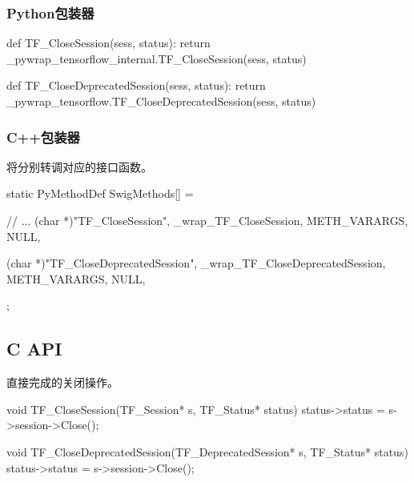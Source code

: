 \begin{content}
\subsubsection{Python包装器}

\begin{leftbar}
\begin{python}[caption={tensorflow/bazel-bin/tensorflow/python/pywrap\_tensorflow\_internal.py}]
def TF_CloseSession(sess, status):
    return _pywrap_tensorflow_internal.TF_CloseSession(sess, status)

def TF_CloseDeprecatedSession(sess, status):
  return _pywrap_tensorflow.TF_CloseDeprecatedSession(sess, status)
\end{python}
\end{leftbar}

\subsubsection{C++包装器}

将分别转调对应的接口函数。

\begin{leftbar}
\begin{c++}[caption={tensorflow/bazel-bin/tensorflow/python/pywrap\_tensorflow\_internal.cc}]
static PyMethodDef SwigMethods[] = {
  // ...
  { (char *)"TF_CloseSession", 
    _wrap_TF_CloseSession, METH_VARARGS, NULL},

  { (char *)"TF_CloseDeprecatedSession", 
    _wrap_TF_CloseDeprecatedSession, METH_VARARGS, NULL},
};
\end{c++}
\end{leftbar}

\subsection{C API}

直接完成的关闭操作。

\begin{leftbar}
\begin{c++}[caption={tensorflow/c/c\_api.c}]
void TF_CloseSession(TF_Session* s, TF_Status* status) {
  status->status = s->session->Close();
}

void TF_CloseDeprecatedSession(TF_DeprecatedSession* s, TF_Status* status) {
  status->status = s->session->Close();
}
\end{c++}
\end{leftbar}


\end{content}

